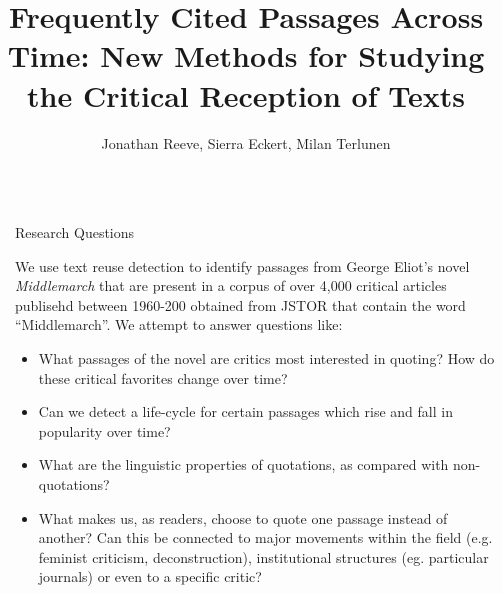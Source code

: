\documentclass[final]{beamer}
\title{Frequently Cited Passages Across Time: New
Methods for Studying the Critical Reception of
Texts} %
\author{Jonathan Reeve, Sierra Eckert, Milan Terlunen} %
\institute{Department of English and Comparative Literature, Columbia University} %
\newlength{\sepwid}
\newlength{\onecolwid}
\begin{document}

\setlength{\belowcaptionskip}{2ex} %
\setlength\belowdisplayshortskip{2ex} %

\begin{frame}[t] %

\begin{columns}[t] %

\begin{column}{\sepwid}\end{column} %

\begin{column}{\onecolwid} %


\begin{alertblock}{Research Questions}

We use text reuse detection to identify passages from George Eliot's novel \emph{Middlemarch} that are present in a corpus of over 4,000 critical articles publisehd between 1960-200 obtained from JSTOR that contain the word ``Middlemarch''. We attempt to answer questions like: 

\begin{itemize}
\item What passages of the novel are critics most interested in quoting? How do these critical favorites change over time?  
\item Can we detect a life-cycle for certain passages which rise and fall in popularity over time?
\item What are the linguistic properties of quotations, as compared with non-quotations?
\item What makes us, as readers, choose to quote one passage instead of another? Can this be connected to major movements within the field (e.g. feminist criticism, deconstruction), institutional structures (eg. particular journals) or even to a specific critic?
\end{itemize}


\end{alertblock}
\end{column}
\end{columns}
\end{frame}
\end{document}
